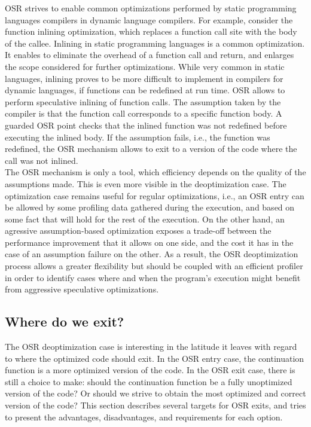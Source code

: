 OSR strives to enable common optimizations performed by static programming languages compilers in dynamic language compilers.
For example, consider the function inlining optimization, which replaces a function call site with the body of the callee. 
Inlining in static programming languages is a common optimization.
It enables to eliminate the overhead of a function call and return, and enlarges the scope considered for further optimizations.
While very common in static languages, inlining proves to be more difficult to implement in compilers for dynamic languages, if functions can be redefined at run time.
OSR allows to perform speculative inlining of function calls. 
The assumption taken by the compiler is that the function call corresponds to a specific function body. 
A guarded OSR point checks that the inlined function was not redefined before executing the inlined body.
If the assumption fails, i.e., the function was redefined, the OSR mechanism allows to exit to a version of the code where the call was not inlined.\\

The OSR mechanism is only a tool, which efficiency depends on the quality of the assumptions made.
This is even more visible in the deoptimization case.
The optimization case remains useful for regular optimizations, i.e., an OSR entry can be allowed by some profiling data gathered during the execution, and based on some fact that will hold for the rest of the execution.
On the other hand, an agressive assumption-based optimization exposes a trade-off between the performance improvement that it allows on one side, and the cost it has in the case of an assumption failure on the other.
As a result, the OSR deoptimization process allows a greater flexibility but should be coupled with an efficient profiler in order to identify cases where and when the program's execution might benefit from aggressive speculative optimizations.\\

\subsection{Where do we exit?}
The OSR deoptimization case is interesting in the latitude it leaves with regard to where the optimized code should exit.
In the OSR entry case, the continuation function is a more optimized version of the code.
In the OSR exit case, there is still a choice to make: should the continuation function be a fully unoptimized version of the code? Or should we strive to obtain the most optimized and correct version of the code?
This section describes several targets for OSR exits, and tries to present the advantages, disadvantages, and requirements for each option.\\

